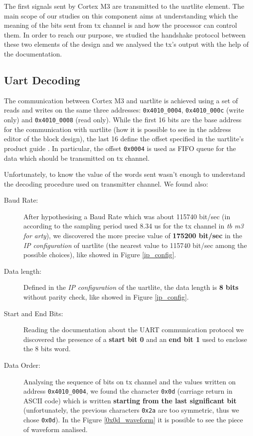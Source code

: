 
The first signals sent by Cortex M3 are transmitted to the uartlite element. The main scope of our studies on this component aims at understanding which the meaning of the bits sent from tx channel is and how the processor can control them. In order to reach our purpose, we studied the handshake protocol between these two elements of the design and we analysed the tx’s output with the help of the documentation.


{\color{Blue}\subsection{Uart Decoding}}

The communication between Cortex M3 and uartlite is achieved using a set of reads and writes on the same three addresses: \verb+0x4010_0004+, \verb+0x4010_000c+ (write only) and \verb+0x4010_0008+ (read only).
While the first 16 bits are the base address for the communication with uartlite (how it is possible to see in the address editor of the block design), the last 16 define the offset specified in the uartlite's product guide \cite[Chapter2.Register Space]{AXIUartguide}. In particular, the offset \verb+0x0004+ is used as FIFO queue for the data which should be transmitted on tx channel.
\newline

Unfortunately, to know the value of the words sent wasn’t enough to understand the decoding procedure used on transmitter channel. We found also:
{\flushleft
\begin{description}

\item[Baud Rate:] After hypothesising a Baud Rate which was about 115740 bit/sec (in according to the sampling period used 8.34 us for the tx channel in \textit{tb m3 for arty}), we discovered the more precise value of \textbf{175200 bit/sec} in the \textit{IP configuration} of uartlite (the nearest value to 115740 bit/sec among the possible choices), like showed in Figure \ref{ip_config}.
\item[Data length:] Defined in the \textit{IP configuration}
of the uartlite, the data length is \textbf{8 bits} without parity check, like showed in Figure \ref{ip_config}.

\item[Start and End Bits:] Reading the documentation about the UART communication protocol\cite{UartBasics} we discovered the presence of a \textbf{start bit 0} and an \textbf{end bit 1} used to enclose the 8 bits word.

\item[Data Order:] Analysing the sequence of bits on tx channel and the values written on address \verb+0x4010_0004+,  we found the character \verb+0x0d+ (carriage return in ASCII code) which is written \textbf{starting from the last significant bit} (unfortunately, the previous characters \verb+0x2a+ are too symmetric, thus we chose \verb+0x0d+). In the Figure \ref{0x0d_waveform} it is possible to see the piece of waveform analised.
\end{description}
}

